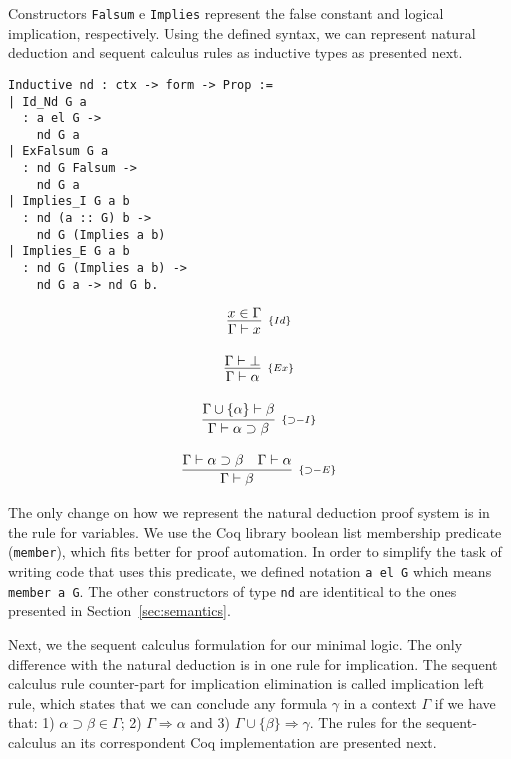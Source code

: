 \documentclass[12pt]{article}
\theoremstyle{definition}
\begin{document}
Constructors \lstinline{Falsum} e \lstinline{Implies} represent the
false constant and logical implication, respectively. Using the defined
syntax, we can represent natural deduction and sequent calculus rules as
inductive types as presented next.

\begin{minipage}[c]{0.6\textwidth}
\begin{lstlisting}
Inductive nd : ctx -> form -> Prop :=
| Id_Nd G a
  : a el G ->
    nd G a
| ExFalsum G a
  : nd G Falsum ->
    nd G a
| Implies_I G a b
  : nd (a :: G) b ->
    nd G (Implies a b)
| Implies_E G a b
  : nd G (Implies a b) ->
    nd G a -> nd G b.
\end{lstlisting}
\end{minipage}
\begin{minipage}[c]{0.3\textwidth}
\[
\begin{array}{c}
\infer[_{\{Id\}}]{\Gamma \vdash x}{x \in \Gamma} \\ \\
\infer[_{\{Ex\}}]{\Gamma \vdash \alpha}{\Gamma \vdash \bot}\\ \\
\infer[_{\{\supset-I\}}]{\Gamma \vdash \alpha \supset \beta}{\Gamma \cup \{\alpha\} \vdash \beta}\\ \\
\infer[_{\{\supset-E\}}]{\Gamma \vdash \beta}{\Gamma \vdash \alpha \supset \beta & \Gamma \vdash \alpha}
\end{array}
\]
\end{minipage}

The only change on how we represent the natural deduction proof system is in the
rule for variables. We use the Coq library boolean list membership predicate
(\lstinline{member}), which fits better for proof automation. In order to
simplify the task of writing code that uses this predicate, we defined
notation \lstinline{a el G} which means \lstinline{member a G}. The other
constructors of type \lstinline{nd} are identitical to the ones presented in
Section~\ref{sec:semantics}.

Next, we the sequent calculus formulation for our minimal logic. The only
difference with the natural deduction is in one rule for implication. The
sequent calculus rule counter-part for implication elimination is called
implication left rule, which states that we can conclude any formula $\gamma$
in a context $\Gamma$ if we have that: 1) $\alpha \supset \beta \in \Gamma$;
2) $\Gamma \Rightarrow \alpha$ and 3) $\Gamma \cup \{\beta\} \Rightarrow
\gamma$. The rules for the sequent-calculus an its correspondent Coq
implementation are presented next.
\end{document}
